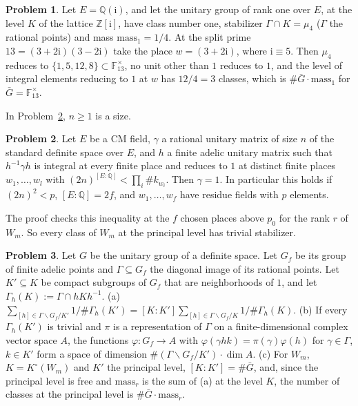 \documentclass[reqno]{amsart}
\theoremstyle{plain}
\theoremstyle{definition}
\newtheorem{problem}{Problem}[section]
\theoremstyle{remark}
\newcommand{\Z}{\mathbb{Z}}
\newcommand{\Q}{\mathbb{Q}}
\newcommand{\F}{\mathbb{F}}
\newcommand{\Gb}{\bar G}
\newcommand{\mass}{\mathrm{mass}_r}
\begin{document}
\begin{problem}\label{pr:gaussian-classes}
Let \(E = \Q(\mathrm i)\), and let the unitary group of rank one over \(E\), at the level \(K\) of the lattice \(\Z[\mathrm i]\), have class number one, stabilizer \(\Gamma \cap K = \mu_4\) (\(\Gamma\) the rational points) and mass \(\mathrm{mass}_1 = 1/4\).  At the split prime \(13 = (3+2\mathrm i)(3-2\mathrm i)\) take the place \(w = (3+2\mathrm i)\), where \(\mathrm i \equiv 5\).  Then \(\mu_4\) reduces to \(\{1, 5, 12, 8\} \subset \F_{13}^\times\), no unit other than \(1\) reduces to \(1\), and the level of integral elements reducing to \(1\) at \(w\) has \(12/4 = 3\) classes, which is \(\#\Gb\cdot\mathrm{mass}_1\) for \(\Gb = \F_{13}^\times\).
\end{problem}

In Problem~\ref{pr:free}, \(n \ge 1\) is a size.

\begin{problem}\label{pr:free}
Let \(E\) be a CM field, \(\gamma\) a rational unitary matrix of size \(n\) of the standard definite space over \(E\), and \(h\) a finite adelic unitary matrix such that \(h^{-1}\gamma h\) is integral at every finite place and reduces to \(1\) at distinct finite places \(w_1, \dots, w_l\) with \((2n)^{[E:\Q]} < \prod_i \#k_{w_i}\).  Then \(\gamma = 1\).  In particular this holds if \((2n)^2 < p\), \([E:\Q] = 2f\), and \(w_1, \dots, w_f\) have residue fields with \(p\) elements.
\end{problem}

The proof checks this inequality at the \(f\) chosen places above \(p_0\) for the rank \(r\) of \(W_m\).  So every class of \(W_m\) at the principal level has trivial stabilizer.

\begin{problem}\label{pr:class-count}
Let \(G\) be the unitary group of a definite space.  Let \(G_f\) be its group of finite adelic points and \(\Gamma\subseteq G_f\) the diagonal image of its rational points.  Let \(K'\subseteq K\) be compact subgroups of \(G_f\) that are neighborhoods of \(1\), and let \(\Gamma_h(K) := \Gamma\cap hKh^{-1}\).
(a) \(\sum_{[h] \in \Gamma\backslash G_f/K'} 1/\#\Gamma_h(K') = [K : K']\sum_{[h] \in \Gamma\backslash G_f/K} 1/\#\Gamma_h(K)\).
(b) If every \(\Gamma_h(K')\) is trivial and \(\pi\) is a representation of \(\Gamma\) on a finite-dimensional complex vector space \(A\), the functions \(\varphi\colon G_f \to A\) with \(\varphi(\gamma h k) = \pi(\gamma)\varphi(h)\) for \(\gamma \in \Gamma\), \(k \in K'\) form a space of dimension \(\#(\Gamma\backslash G_f/K')\cdot\dim A\).
(c) For \(W_m\), \(K = K^\circ(W_m)\) and \(K'\) the principal level, \([K : K'] = \#\Gb\), and, since the principal level is free and \(\mass\) is the sum of (a) at the level \(K\), the number of classes at the principal level is \(\#\Gb\cdot\mass\).
\end{problem}
\end{document}

